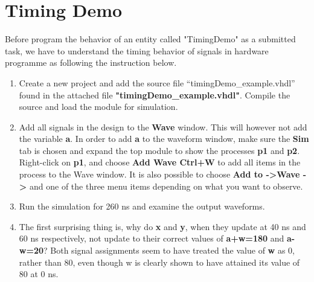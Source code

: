 \documentclass[a4paper,12pt]{article}
\begin{document}
\pagestyle{empty}
\setlength{\parindent}{0em}

\section*{Timing Demo}

Before program the behavior of an entity called "TimingDemo" as a submitted task, we have to understand the timing behavior of signals in hardware programme as following the instruction below.

\begin{enumerate}
\item %
Create a new project and add the source file “timingDemo\_example.vhdl” found in the attached file \textbf{"timingDemo\_example.vhdl"}. Compile the source and load the module for simulation.

\item %
Add all signals in the design to the \textbf{Wave} window. This will however not add the variable \textbf{a}. In order to add \textbf{a} to the waveform window, make sure the \textbf{Sim} tab is chosen and expand the top module to show the processes \textbf{p1} and \textbf{p2}. Right-click on \textbf{p1}, and choose \textbf{Add Wave Ctrl+W} to add all items in the process to the Wave window. It is also possible to choose \textbf{Add to -\textgreater Wave -\textgreater} and one of the three menu items depending on what you want to observe.

\item %
Run the simulation for 260 ns and examine the output waveforms.

\item %
The first surprising thing is, why do \textbf{x} and \textbf{y}, when they update at 40 ns and 60 ns respectively, not update to their correct values of \textbf{a+w=180} and \textbf{a-w=20}? Both signal assignments seem to have treated the value of \textbf{w} as 0, rather than 80, even though w is clearly shown to have attained its value of 80 at 0 ns.


\end{enumerate}
\end{document}
